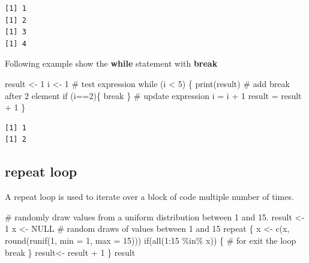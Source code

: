 \documentclass[
  letterpaper,
  DIV=11,
  numbers=noendperiod]{scrreprt}
\newenvironment{Shaded}{\begin{snugshade}}{\end{snugshade}}
\newcommand{\AttributeTok}[1]{\textcolor[rgb]{0.40,0.45,0.13}{#1}}
\newcommand{\CommentTok}[1]{\textcolor[rgb]{0.37,0.37,0.37}{#1}}
\newcommand{\ConstantTok}[1]{\textcolor[rgb]{0.56,0.35,0.01}{#1}}
\newcommand{\ControlFlowTok}[1]{\textcolor[rgb]{0.00,0.23,0.31}{#1}}
\newcommand{\DecValTok}[1]{\textcolor[rgb]{0.68,0.00,0.00}{#1}}
\newcommand{\FunctionTok}[1]{\textcolor[rgb]{0.28,0.35,0.67}{#1}}
\newcommand{\NormalTok}[1]{\textcolor[rgb]{0.00,0.23,0.31}{#1}}
\newcommand{\OtherTok}[1]{\textcolor[rgb]{0.00,0.23,0.31}{#1}}
\newcommand{\SpecialCharTok}[1]{\textcolor[rgb]{0.37,0.37,0.37}{#1}}
\begin{document}
\begin{verbatim}
[1] 1
[1] 2
[1] 3
[1] 4
\end{verbatim}

Following example show the \textbf{while} statement with \textbf{break}

\begin{Shaded}
\begin{Highlighting}[]
\NormalTok{result }\OtherTok{\textless{}{-}} \DecValTok{1}
\NormalTok{i }\OtherTok{\textless{}{-}} \DecValTok{1}
\CommentTok{\# test expression}
\ControlFlowTok{while}\NormalTok{ (i }\SpecialCharTok{\textless{}} \DecValTok{5}\NormalTok{) \{}
    \FunctionTok{print}\NormalTok{(result)}
\CommentTok{\# add break after 2 element }
  \ControlFlowTok{if}\NormalTok{ (i}\SpecialCharTok{==}\DecValTok{2}\NormalTok{)\{}
    \ControlFlowTok{break}
\NormalTok{  \}}
\CommentTok{\# update expression}
\NormalTok{   i }\OtherTok{=}\NormalTok{ i }\SpecialCharTok{+} \DecValTok{1}
\NormalTok{   result }\OtherTok{=}\NormalTok{ result }\SpecialCharTok{+} \DecValTok{1}
\NormalTok{\}}
\end{Highlighting}
\end{Shaded}

\begin{verbatim}
[1] 1
[1] 2
\end{verbatim}

\hypertarget{repeat-loop}{%
\subsection{repeat loop}\label{repeat-loop}}

A repeat loop is used to iterate over a block of code multiple number of
times.

\begin{Shaded}
\begin{Highlighting}[]
\CommentTok{\# randomly draw values from a uniform distribution between 1 and 15.}
\NormalTok{result }\OtherTok{\textless{}{-}} \DecValTok{1}
\NormalTok{x }\OtherTok{\textless{}{-}} \ConstantTok{NULL}
\CommentTok{\# random draws of values between 1 and 15 }
\ControlFlowTok{repeat}\NormalTok{ \{}
\NormalTok{        x }\OtherTok{\textless{}{-}} \FunctionTok{c}\NormalTok{(x, }\FunctionTok{round}\NormalTok{(}\FunctionTok{runif}\NormalTok{(}\DecValTok{1}\NormalTok{, }\AttributeTok{min =} \DecValTok{1}\NormalTok{, }\AttributeTok{max =} \DecValTok{15}\NormalTok{)))}
       \ControlFlowTok{if}\NormalTok{(}\FunctionTok{all}\NormalTok{(}\DecValTok{1}\SpecialCharTok{:}\DecValTok{15} \SpecialCharTok{\%in\%}\NormalTok{ x)) \{}
\CommentTok{\# for exit the loop}
          \ControlFlowTok{break}
\NormalTok{        \}}
\NormalTok{result}\OtherTok{\textless{}{-}}\NormalTok{ result }\SpecialCharTok{+} \DecValTok{1}
\NormalTok{\}}
\NormalTok{result}
\end{Highlighting}
\end{Shaded}
\end{document}
